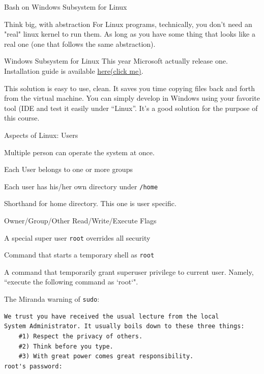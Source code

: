\begin{frame}{Bash on Windows Subsystem for Linux}
\begin{block}{Think big, with abstraction}
	For Linux programs, technically, you don't need an "real" linux kernel to run them. As long as you have some thing that looks like a real one (one that follows the same abstraction). 
\end{block}
\begin{block}{Windows Subsystem for Linux}
	This year Microsoft actually release one. Installation guide is available \href{https://msdn.microsoft.com/zh-cn/commandline/wsl/install\_guide}{here(click me)}.
	
	This solution is easy to use, clean. It saves you time copying files back and forth from the virtual machine. You can simply develop in Windows using your favorite tool (IDE and test it easily under ``Linux''. It's a good solution for the purpose of this course.
\end{block}
\end{frame}

\begin{frame}[fragile]{Aspects of Linux: Users}
\vspace{-0.12in}
\begin{description}[Permission]
	\small
	\item[MultiUser] Multiple person can operate the system at once.
	\item[Group] Each User belongs to one or more groups
	\item[Home Dir] Each user has his/her own directory under \texttt{/home}
	\item[$\sim$/] Shorthand for home directory. This one is user specific.
	\item[Premission] Owner/Group/Other Read/Write/Execute Flags
	\item[root] A special super user \texttt{root} overrides all security 
	\item[su] Command that starts a temporary shell as \texttt{root}
	\item[sudo] A command that temporarily grant superuser privilege to current user. Namely, ``execute the following command as `root`". 
\end{description}
\small{The Miranda warning of \texttt{sudo}:}
\begin{verbatim}
We trust you have received the usual lecture from the local 
System Administrator. It usually boils down to these three things:
	#1) Respect the privacy of others.
	#2) Think before you type.
	#3) With great power comes great responsibility.
root's password:
\end{verbatim}
\end{frame}

